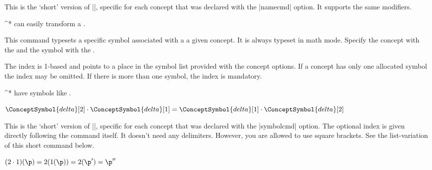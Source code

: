 \documentclass[a4paper]{packagedoc}
\begin{document}


This is the `short' version of |\ConceptName|, specific for each concept that
was declared with the |namecmd| option. It supports the same modifiers.

\begin{latex-example-show}
\delta^* can easily transform a \product.
\end{latex-example-show}



This command typesets a specific symbol associated with a a given concept. It is
always typeset in math mode. Specify the concept with the 
and the symbol with the .

The index is 1-based and points to a place in the symbol list provided with the
concept options. If a concept has only one allocated symbol the index may be
omitted. If there is more than one symbol, the index is mandatory.

\begin{latex-example-show}
\product^* have symbols like .
\end{latex-example-show}
%
\begin{latex-example-show}
$\ConceptSymbol{delta}[2] \cdot \ConceptSymbol{delta}[1] =
 \ConceptSymbol{delta}[1] \cdot \ConceptSymbol{delta}[2]$
\end{latex-example-show}



This is the `short' version of |\ConceptSymbol|, specific for each concept that
was declared with the |symbolcmd| option. The optional index is given directly
following the command itself. It doesn't need any delimiters. However, you are
allowed to use square brackets. See the list-variation of this short command
below.

\begin{latex-example-show}
$(\d2 \cdot \d1)(\p) = \d2(\d1(\p)) = \d2(\p') = \p''$
\end{latex-example-show}
\end{document}
